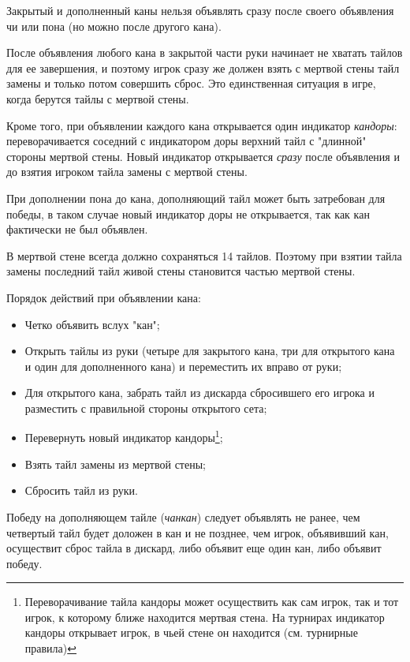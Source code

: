  \hfill {}

Закрытый и дополненный каны нельзя объявлять сразу после своего объявления чи или пона (но можно после другого кана).

После объявления любого кана в закрытой части руки начинает не хватать тайлов для ее завершения, и поэтому игрок сразу же должен взять с мертвой стены тайл замены и только потом совершить сброс. Это единственная ситуация в игре, когда берутся тайлы с мертвой стены.

Кроме того, при объявлении каждого кана открывается один индикатор \textit{кандоры}: переворачивается соседний с индикатором доры верхний тайл с "длинной" стороны мертвой стены. Новый индикатор открывается \textit{сразу} после объявления и до взятия игроком тайла замены с мертвой стены.

При дополнении пона до кана, дополняющий тайл может быть затребован для победы, в таком случае новый индикатор доры не открывается, так как кан фактически не был объявлен.

В мертвой стене всегда должно сохраняться 14 тайлов. Поэтому при взятии тайла замены последний тайл живой стены становится частью мертвой стены.

Порядок действий при объявлении кана:

\begin{itemize}
	\item Четко объявить вслух "кан";
	\item Открыть тайлы из руки (четыре для закрытого кана, три для открытого кана и один для дополненного кана) и переместить их вправо от руки;
	\item Для открытого кана, забрать тайл из дискарда сбросившего его игрока и разместить с правильной стороны открытого сета;
	\item Перевернуть новый индикатор кандоры\footnote{Переворачивание тайла кандоры может осуществить как сам игрок, так и тот игрок, к которому ближе находится мертвая стена. На турнирах индикатор кандоры открывает игрок, в чьей стене он находится (см. турнирные правила)};
	\item Взять тайл замены из мертвой стены;
	\item Сбросить тайл из руки.
\end{itemize}

Победу на дополняющем тайле (\textit{чанкан}) следует объявлять не ранее, чем четвертый тайл будет доложен в кан и не позднее, чем игрок, объявивший кан, осуществит сброс тайла в дискард, либо объявит еще один кан, либо объявит победу.


